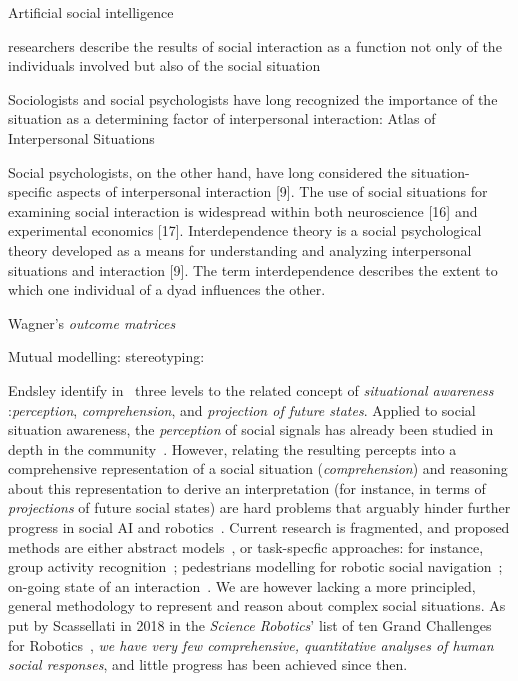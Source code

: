 Artificial social intelligence~\cite{bainbridge1994artificial}

researchers describe the results of social
interaction as a function not only of the individuals involved
but also of the social situation~\cite{rusbult2003interdependence}

Sociologists and social psychologists have long
recognized the importance of the situation as a determining
factor of interpersonal interaction: Atlas of Interpersonal Situations~\cite{kelley2003atlas}

Social psychologists, on the other hand, have long
considered the situation-specific aspects of interpersonal
interaction [9]. The use of social situations for examining
social interaction is widespread within both neuroscience [16]
and experimental economics [17]. Interdependence theory is a
social psychological theory developed as a means for
understanding and analyzing interpersonal situations and
interaction [9]. The term interdependence describes the extent
to which one individual of a dyad influences the other.

Wagner's \emph{outcome matrices}
\cite{wagner2006framework} \cite{wagner2009creating}

Mutual modelling:
\cite{dillenbourg2016symmetry}
stereotyping: \cite{wagner2015robots}



Endsley identify in~\cite{endsley1995theory} three levels to the related concept
of \textit{situational awareness} :\emph{perception}, \emph{comprehension}, and
\emph{projection of future states}. Applied to social situation awareness,
the \emph{perception} of social signals has already been studied in depth in the
community~\cite{pantic2011social,vinciarelli2009social}.  However, relating the
resulting percepts into a comprehensive representation of a social situation
(\emph{comprehension}) and reasoning about this representation to derive an
interpretation (for instance, in terms of \emph{projections} of future social
states) are hard problems that arguably hinder further progress in social AI and
robotics~\cite{yang2018grand}. Current research is fragmented, and proposed
methods are either abstract models~\cite{gordon2016commonsense}, or task-specfic
approaches: for instance, group activity
recognition~\cite{shu2017cern,wu2019learning}; pedestrians modelling for robotic
social navigation~\cite{alahi2016social}; on-going state of an
interaction~\cite{garcía2020explainable}. We are however lacking a more
principled, general methodology to represent and reason about complex social
situations. As put by Scassellati in 2018 in the \emph{Science Robotics}' list of
ten Grand Challenges for Robotics~\cite{yang2018grand}, \emph{we have very few
comprehensive, quantitative analyses of human social responses}, and little
progress has been achieved since then.



